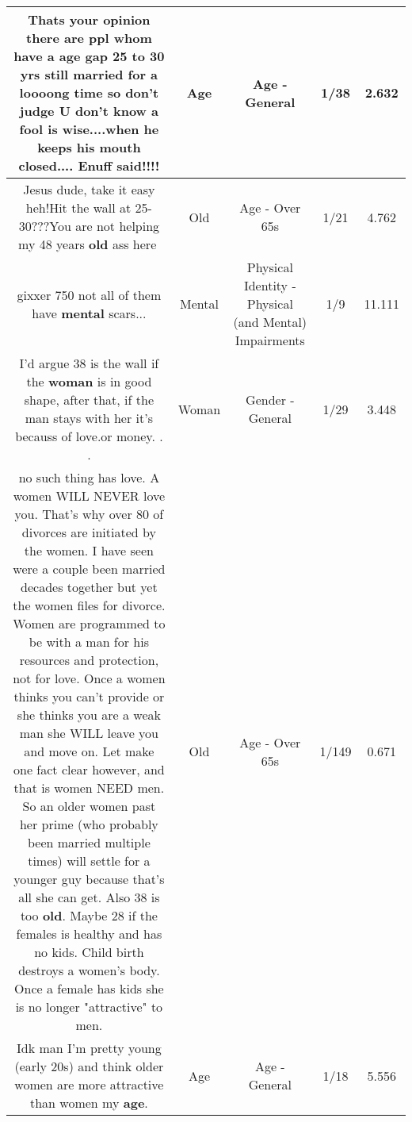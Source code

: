\documentclass[11pt]{article}
\newlength\mylength
\begin{document}
\begin{center}
\begin{longtable}{|C{.65\mylength}|C{.30\mylength}|C{.12\mylength}|C{.12\mylength}|C{.12\mylength}|}
  \small Thats your opinion there are ppl whom have a \textbf{age} gap 25 to 30 yrs still married for a loooong time so don't judge U don't know a fool is wise....when he keeps his mouth closed.... Enuff said!!!!\normalsize   & Age & Age - General & 1/38 & 2.632 \\  \hline
  \small Jesus dude, take it easy heh!Hit the wall at 25-30???You are not helping my 48 years \textbf{old} ass here🤣\normalsize   & Old & Age - Over 65s & 1/21 & 4.762 \\  \hline
  \small gixxer 750 not all of them have \textbf{mental} scars...\normalsize   & Mental & Physical Identity - Physical (and Mental) Impairments & 1/9 & 11.111 \\  \hline
  \small I'd argue 38 is the wall if the \textbf{woman} is in good shape, after that, if the man stays with her it's becauss of love.or money. . .\normalsize   & Woman & Gender - General & 1/29 & 3.448 \\  \hline
  \small {} no such thing has love.  A women WILL NEVER love you.  That's why over 80 of divorces are initiated by the women.  I have seen were a couple been married decades together but yet the women files for divorce.  Women are programmed to be with a man for his resources and protection, not for love.  Once a women thinks you can't provide or she thinks you are a weak man she WILL leave you and move on.  Let make one fact clear however, and that is women NEED men.  So an older women past her prime (who probably been married multiple times) will settle for a younger guy because that's all she can get. Also 38 is too \textbf{old}.  Maybe 28 if the females is healthy and has no kids.  Child birth destroys a women's body.   Once a female has kids she is no longer "attractive" to men.\normalsize   & Old & Age - Over 65s & 1/149 & 0.671 \\  \hline
  \small Idk man I'm pretty young (early 20s) and think older women are more attractive than women my \textbf{age}.\normalsize   & Age & Age - General & 1/18 & 5.556 \\  \hline

\end{longtable}
\end{center}
\end{document}
